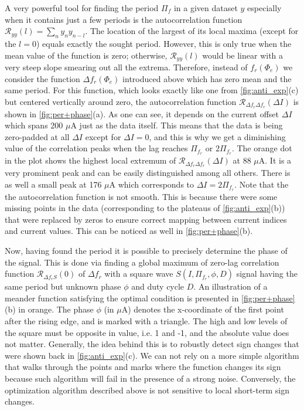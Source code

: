 \documentclass[%
 aip,
 amsmath,amssymb,
 reprint,%
]{revtex4-1}
\begin{document}
A very powerful tool for finding the period $\Pi_f$ in a given dataset $y$ especially when it contains just a few periods is the autocorrelation function $\mathcal{R}_{y y}(l) = \sum_n y_n y_{n-l}$. The location of the largest of its local maxima (except for the $l=0$) equals exactly the sought period. However, this is only true when the mean value of the function is zero; otherwise, $\mathcal{R}_{y y}(l)$ would be linear with a very steep slope smearing out all the extrema. Therefore, instead of $f_r (\Phi_e)$ we consider the function $\Delta f_r (\Phi_e)$ introduced above which has zero mean and the same period. For this function, which looks exactly like one from \autoref{fig:anti_exp}(c) but centered vertically around zero, the autocorrelation function $\mathcal{R}_{\Delta f_r \Delta f_r}(\Delta I)$ is shown in \autoref{fig:per+phase}(a). As one can see, it depends on the current offset $\Delta I$ which spans 200 $\mu$A just as the data itself. This means that the data is being zero-padded at all $\Delta I$ except for $\Delta I = 0$, and this is why we get a diminishing value of the correlation peaks when the lag reaches $\Pi_{f_r}$ or $2\Pi_{f_r}$. The orange dot in the plot shows the highest local extremum of $\mathcal{R}_{\Delta f_r \Delta f_r}(\Delta I)$ at 88 $\mu$A. It is a very prominent peak and can be easily distinguished among all others. There is as well a small peak at 176 $\mu$A which corresponds to $\Delta I = 2\Pi_{f_r}$. Note that the the autocorrelation function is not smooth. This is because there were some missing points in the data (corresponding to the plateaus of \autoref{fig:anti_exp}(b)) that were replaced by zeros to ensure correct mapping between current indices and current values. This can be noticed as well in \autoref{fig:per+phase}(b).

Now, having found the period it is possible to precisely determine the phase of the signal. This is done via finding a global maximum of zero-lag correlation function  $\mathcal{R}_{\Delta f_r S}(0)$ of $\Delta f_r$ with a square wave $S(I, \Pi_{f_r}, \phi, D)$ signal having the same period but unknown phase $\phi$ and duty cycle $D$. An illustration of a meander function satisfying the optimal condition is presented in \autoref{fig:per+phase}(b) in orange. The phase $\phi$ (in $\mu$A) denotes the x-coordinate of the first point after the rising edge, and is marked with a triangle. The high and low levels of the square must be opposite in value, i.e. 1 and -1, and the absolute value does not matter. Generally, the idea behind this is to robustly detect sign changes that were shown back in \autoref{fig:anti_exp}(c). We can not rely on a more simple algorithm that walks through the points and marks where the function changes its sign because such algorithm will fail in the presence of a strong noise. Conversely, the optimization algorithm described above is not sensitive to local short-term sign changes.
\end{document}
